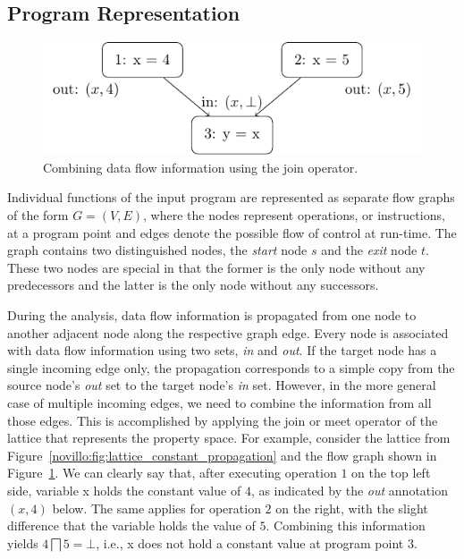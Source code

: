 \subsection{Program Representation}
\label{novillo:sec:program_representation}

\begin{figure}[b]
  \begin{center}
    \includegraphics{contr_flow_graph}
  \end{center}
  \vspace{-1em}
  \caption{Combining data flow information using the join operator.}
  \label{novillo:fig:control_flow_graph}
\end{figure}

Individual functions of the input program are represented as separate flow
graphs of the form $G = (V,E)$, where the nodes represent operations, or
instructions, at a program point and edges denote the possible flow of control
at run-time. The graph contains two distinguished nodes, the \emph{start} node
$s$ and the \emph{exit} node $t$. These two nodes are special in that the former
is the only node without any predecessors and the latter is the only node
without any successors.

During the analysis, data flow information is propagated from one node to
another adjacent node along the respective graph edge. Every node is associated
with data flow information using two sets, \emph{in} and \emph{out}. If the
target node has a single incoming edge only, the propagation corresponds to a
simple copy from the source node's \emph{out} set to the target node's \emph{in}
set. However, in the more general case of multiple incoming edges, we need to
combine the information from all those edges. This is accomplished by applying
the join or meet operator of the lattice that represents the property space. For
example, consider the lattice from
Figure~\ref{novillo:fig:lattice_constant_propagation} and the flow graph shown
in Figure~\ref{novillo:fig:control_flow_graph}. We can clearly say that, after
executing operation $1$ on the top left side, variable x holds the
constant value of $4$, as indicated by the \emph{out} annotation $(x, 4)$ below.
The same applies for operation $2$ on the right, with the slight difference that
the variable holds the value of $5$. Combining this information yields $4
\bigsqcap 5 = \bot$, i.e., x does not hold a constant value at program point 3.

